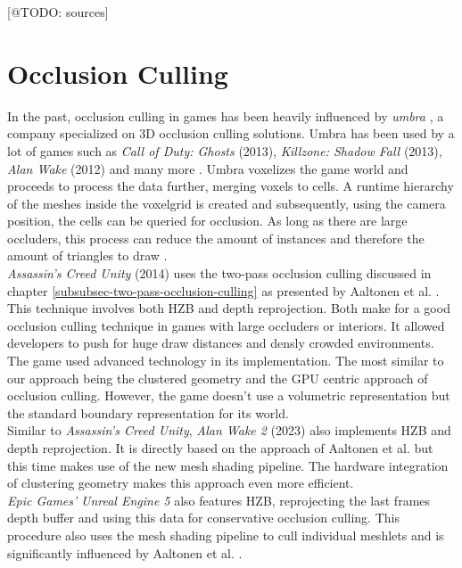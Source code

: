 [@TODO: sources]


\section{Occlusion Culling}

In the past, occlusion culling in games has been heavily influenced by \emph{umbra} \cite{Umbra2024}, a company 
specialized on 3D occlusion culling solutions. Umbra has been used by a lot of games such as \emph{Call of Duty: Ghosts} 
(2013), \emph{Killzone: Shadow Fall} (2013), \emph{Alan Wake} (2012) and many more 
\cite{UmbraWiki,CallOfDutyGhostsCredits, KillzoneUmbra,AlanWakeUmbra}. Umbra voxelizes the game world and proceeds 
to process the data further, merging voxels to cells. A runtime hierarchy of the meshes inside the voxelgrid is created 
and subsequently, using the camera position, the cells can be queried for occlusion. As long as there are large 
occluders, this process can reduce the amount of instances and therefore the amount of triangles to draw 
\cite{Bonet2021}. \\

\noindent
\emph{Assassin's Creed Unity} (2014) uses the two-pass occlusion culling discussed in chapter 
\ref{subsubsec-two-pass-occlusion-culling} as presented by Aaltonen et al. \cite{Aaltonen2015}. This technique 
involves both \ac{HZB} and depth reprojection. Both make for a good occlusion culling technique in games with large 
occluders or interiors. It allowed developers to push for huge draw distances and densly crowded environments. The 
game used advanced technology in its implementation. The most similar to our approach being the clustered geometry 
and the \ac{GPU} centric approach of occlusion culling. However, the game doesn't use a volumetric representation but 
the standard boundary representation for its world. \\

\noindent
Similar to \emph{Assassin's Creed Unity}, \emph{Alan Wake 2} (2023) also implements \ac{HZB} and depth reprojection. 
It is directly based on the approach of Aaltonen et al. \cite{Aaltonen2015} but this time makes use of the new mesh 
shading pipeline. The hardware integration of clustering geometry makes this approach even more efficient. \\

\noindent
\emph{Epic Games'} \emph{Unreal Engine 5} also features \ac{HZB}, reprojecting the last frames depth buffer and using 
this data for conservative occlusion culling. This procedure also uses the mesh shading pipeline to cull individual 
meshlets and is significantly influenced by Aaltonen et al. \cite{Aaltonen2015, Karis2021}. 



